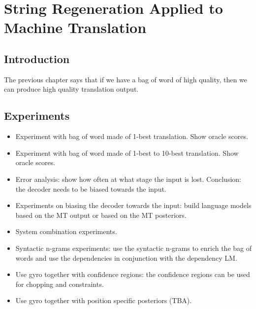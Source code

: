 \chapter{String Regeneration Applied to Machine Translation}

\section{Introduction}

The previous chapter says that if we have a bag of word of high
quality, then we can produce high quality translation output.

\section{Experiments}

\begin{itemize}
  \item Experiment with bag of word made of 1-best translation. Show oracle scores.
  \item Experiment with bag of word made of 1-best to 10-best translation. Show oracle scores.
  \item Error analysis: show how often at what stage the input is lost. Conclusion: the
    decoder needs to be biased towards the input.
  \item Experiments on biasing the decoder towards the input: build language models
    based on the MT output or based on the MT posteriors.
  \item System combination experiments.
  \item Syntactic n-grams experiments: use the syntactic n-grams to enrich the
    bag of words and use the dependencies in conjunction with the dependency LM.
  \item Use gyro together with confidence regions: the confidence regions can be used
    for chopping and constraints. 
  \item Use gyro together with position specific posteriors (TBA).
\end{itemize}
